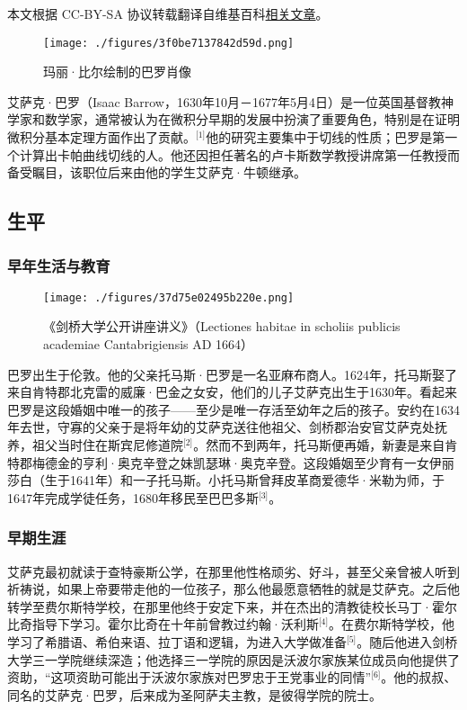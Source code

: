 
本文根据 CC-BY-SA 协议转载翻译自维基百科\href{https://en.wikipedia.org/wiki/Isaac_Barrow}{相关文章}。

\begin{figure}[ht]
\centering
\texttt{[image: ./figures/3f0be7137842d59d.png]}
\caption{玛丽·比尔绘制的巴罗肖像} \label{fig_ASKbl_1}
\end{figure}
艾萨克·巴罗（Isaac Barrow，1630年10月－1677年5月4日）是一位英国基督教神学家和数学家，通常被认为在微积分早期的发展中扮演了重要角色，特别是在证明微积分基本定理方面作出了贡献。\(^\text{[1]}\)他的研究主要集中于切线的性质；巴罗是第一个计算出卡帕曲线切线的人。他还因担任著名的卢卡斯数学教授讲席第一任教授而备受瞩目，该职位后来由他的学生艾萨克·牛顿继承。
\subsection{生平}
\subsubsection{早年生活与教育}
\begin{figure}[ht]
\centering
\texttt{[image: ./figures/37d75e02495b220e.png]}
\caption{《剑桥大学公开讲座讲义》（Lectiones habitae in scholiis publicis academiae Cantabrigiensis AD 1664）} \label{fig_ASKbl_2}
\end{figure}
巴罗出生于伦敦。他的父亲托马斯·巴罗是一名亚麻布商人。1624年，托马斯娶了来自肯特郡北克雷的威廉·巴金之女安，他们的儿子艾萨克出生于1630年。看起来巴罗是这段婚姻中唯一的孩子——至少是唯一存活至幼年之后的孩子。安约在1634年去世，守寡的父亲于是将年幼的艾萨克送往他祖父、剑桥郡治安官艾萨克处抚养，祖父当时住在斯宾尼修道院\(^\text{[2]}\)。然而不到两年，托马斯便再婚，新妻是来自肯特郡梅德金的亨利·奥克辛登之妹凯瑟琳·奥克辛登。这段婚姻至少育有一女伊丽莎白（生于1641年）和一子托马斯。小托马斯曾拜皮革商爱德华·米勒为师，于1647年完成学徒任务，1680年移民至巴巴多斯\(^\text{[3]}\)。
\subsubsection{早期生涯}
艾萨克最初就读于查特豪斯公学，在那里他性格顽劣、好斗，甚至父亲曾被人听到祈祷说，如果上帝要带走他的一位孩子，那么他最愿意牺牲的就是艾萨克。之后他转学至费尔斯特学校，在那里他终于安定下来，并在杰出的清教徒校长马丁·霍尔比奇指导下学习。霍尔比奇在十年前曾教过约翰·沃利斯\(^\text{[4]}\)。在费尔斯特学校，他学习了希腊语、希伯来语、拉丁语和逻辑，为进入大学做准备\(^\text{[5]}\)。随后他进入剑桥大学三一学院继续深造；他选择三一学院的原因是沃波尔家族某位成员向他提供了资助，“这项资助可能出于沃波尔家族对巴罗忠于王党事业的同情”\(^\text{[6]}\)。他的叔叔、同名的艾萨克·巴罗，后来成为圣阿萨夫主教，是彼得学院的院士。

